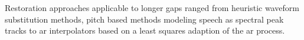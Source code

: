 Restoration approaches applicable to longer gaps ranged from heuristic waveform substitution methods\cite{Goodman1986}\cite{Niediwiecki2001}, pitch based methods modeling speech as spectral peak tracks\cite{Maher1994}\cite{McAulay1986} to \gls{ar} interpolators\cite{Esquef2006} based on a least squares adaption of the \gls{ar} process\cite{Godsill1998book}.








